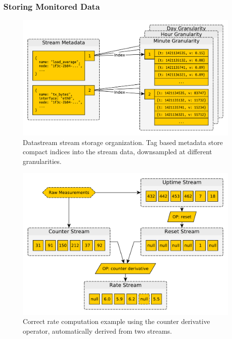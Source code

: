 \documentclass[5p,sort&compress]{elsarticle}
\begin{document}
\subsubsection{Storing Monitored Data}

\begin{figure}
  \centering
  \includegraphics[scale=0.4]{figures/datastream-storage.pdf}
  \caption{Datastream stream storage organization. Tag based metadata store compact indices into the stream data, downsampled at different granularities.}
  \label{fig:datastream-storage}
\end{figure}

\begin{figure}
  \centering
  \includegraphics[scale=0.4]{figures/datastream-counter-reset.pdf}
  \caption{Correct rate computation example using the counter derivative operator, automatically derived from two streams.}
  \label{fig:datastream-counter-reset}
\end{figure}
\end{document}
